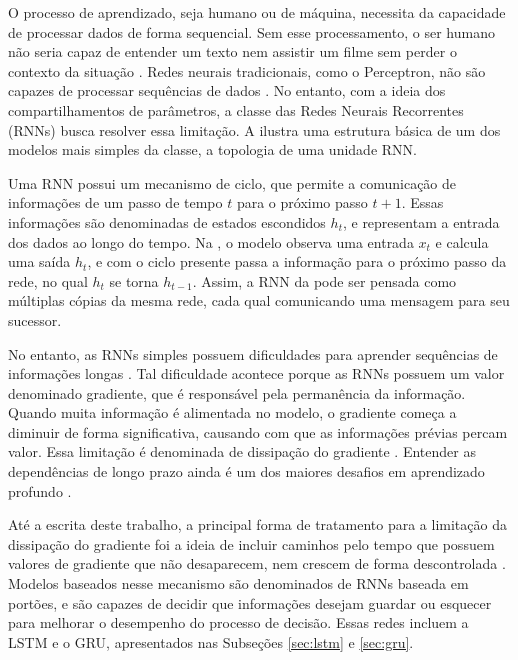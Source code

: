 O processo de aprendizado, seja humano ou de máquina, necessita da capacidade de processar dados de forma sequencial. Sem esse processamento, o ser humano não seria capaz de entender um texto nem assistir um filme sem perder o contexto da situação \cite{deep_learning}. Redes neurais tradicionais, como o Perceptron, não são capazes de processar sequências de dados \cite{redesneurais}. No entanto, com a ideia dos compartilhamentos de parâmetros, a classe das Redes Neurais Recorrentes (RNNs) \cite{rnn} busca resolver essa limitação. A  ilustra uma estrutura básica de um dos modelos mais simples da classe, a topologia de uma unidade \acrshort{RNN}.

%

Uma \acrshort{RNN} possui um mecanismo de ciclo, que permite a comunicação de informações de um passo de tempo $t$ para o próximo passo $t+1$. Essas informações são denominadas de estados escondidos $h_t$, e representam a entrada dos dados ao longo do tempo. Na , o modelo observa uma entrada $x_t$ e calcula uma saída $h_t$, e com o ciclo presente passa a informação para o próximo passo da rede, no qual $h_t$ se torna $h_{t-1}$. Assim, a \acrshort{RNN} da  pode ser pensada como múltiplas cópias da mesma rede, cada qual comunicando uma mensagem para seu sucessor.

No entanto, as \acrshort{RNN}s simples possuem dificuldades para aprender sequências de informações longas \cite{lstm}. Tal dificuldade acontece porque as \acrshort{RNN}s possuem um valor denominado gradiente, que é responsável pela permanência da informação. Quando muita informação é alimentada no modelo, o gradiente começa a diminuir de forma significativa, causando com que as informações prévias percam valor. Essa limitação é denominada de dissipação do gradiente \cite{redesneurais}. Entender as dependências de longo prazo ainda é um dos maiores desafios em aprendizado profundo \cite{deep_learning}.

Até a escrita deste trabalho, a principal forma de tratamento para a limitação da dissipação do gradiente foi a ideia de incluir caminhos pelo tempo que possuem valores de gradiente que não desaparecem, nem crescem de forma descontrolada \cite{deep_learning}. Modelos baseados nesse mecanismo são denominados de \acrshort{RNN}s baseada em portões, e são capazes de decidir que informações desejam guardar ou esquecer para melhorar o desempenho do processo de decisão. Essas redes incluem a \acrlong{LSTM} e o \acrlong{GRU}, apresentados nas Subseções \ref{sec:lstm} e \ref{sec:gru}.

